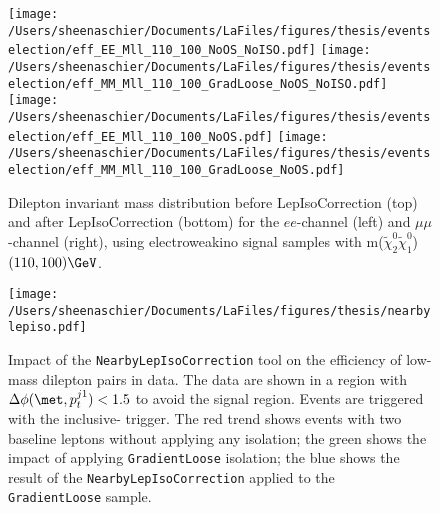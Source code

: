   \begin{figure}[tbp]
     \texttt{[image: /Users/sheenaschier/Documents/LaFiles/figures/thesis/eventselection/eff\_EE\_Mll\_110\_100\_NoOS\_NoISO.pdf]}
       \texttt{[image: /Users/sheenaschier/Documents/LaFiles/figures/thesis/eventselection/eff\_MM\_Mll\_110\_100\_GradLoose\_NoOS\_NoISO.pdf]}\\
     \texttt{[image: /Users/sheenaschier/Documents/LaFiles/figures/thesis/eventselection/eff\_EE\_Mll\_110\_100\_NoOS.pdf]}
     \texttt{[image: /Users/sheenaschier/Documents/LaFiles/figures/thesis/eventselection/eff\_MM\_Mll\_110\_100\_GradLoose\_NoOS.pdf]}\\
   \caption{Dilepton invariant mass distribution before LepIsoCorrection (top) and after LepIsoCorrection (bottom) for the $ee$-channel (left) and $\mu\mu$-channel (right), using electroweakino signal samples with m($\tilde\chi_2^0\tilde\chi_1^0$) $(110, 100)\GeV$.}
   \label{fig:EffMll_ISOCorr}
 \end{figure}
 \begin{figure}[tbp]
 \centering
  \texttt{[image: /Users/sheenaschier/Documents/LaFiles/figures/thesis/nearbylepiso.pdf]}
  \caption{Impact of the \texttt{NearbyLepIsoCorrection} tool on the efficiency of low-mass dilepton pairs in data.  The data are shown in a region with $\Delta\phi(\met, p_{t}^{j1})<1.5$ to avoid the signal region.  Events are triggered with the inclusive-\met{} trigger.  The red trend shows events with two baseline leptons without applying any isolation; the green shows the impact of applying \texttt{GradientLoose} isolation; the blue shows the result of the \texttt{NearbyLepIsoCorrection} applied to the \texttt{GradientLoose} sample.  %
  }
 \label{fig:nearbylepiso}
 \end{figure}
 

 
 


